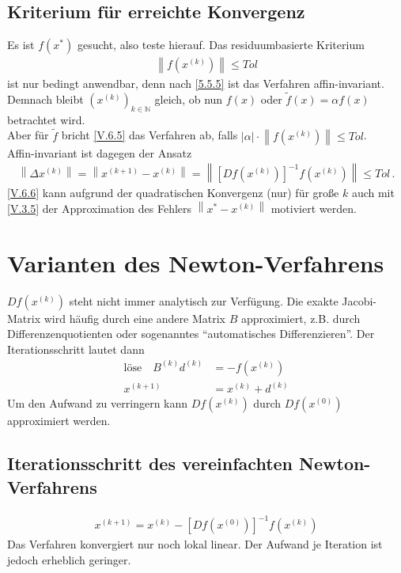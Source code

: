 \documentclass[ngerman,fontsize=11pt, paper=a4, parskip=half, titlepage=true, toc=bib]{scrbook}
\newcommand{\N}{\mathds{N}}
\newcommand{\nn}[1]{\left\| #1 \right\|}
\newcommand{\sectione}[1]{\section{#1} \setcounter{equation}{0}}
\begin{document}
 		
 		\subsection{Kriterium für erreichte Konvergenz}
 		Es ist $f(x^{*})$ gesucht, also teste hierauf. Das residuumbasierte Kriterium
 		\begin{gather}
 			\nn{f(x^{(k)})}\leq Tol
 			\label{V.6.5}
 		\end{gather}
 		ist nur bedingt anwendbar, denn nach \ref{5.5.5} ist das Verfahren affin-invariant.
 		Demnach bleibt $(x^{(k)})_{k\in\N}$ gleich,
 		ob nun $f(x)$ oder $\widetilde{f}(x) =\alpha f(x) $ betrachtet wird.\\
 		Aber für $\widetilde{f}$ bricht \eqref{V.6.5} das Verfahren ab, 
 		falls $|\alpha|\cdot \nn{f(x^{(k)})} \leq Tol$. \\
 		Affin-invariant ist dagegen der Ansatz
 		\begin{gather}
 			\nn{\Delta x^{(k)}}= \nn{x^{(k+1)}-x^{(k)}} 
 					= \nn{[Df(x^{(k)})]^{-1}f(x^{(k)})} 
 					\leq Tol \, .
 					\label{V.6.6}
 		\end{gather}
 		\eqref{V.6.6} kann aufgrund der quadratischen Konvergenz (nur) für 
 		große $k$ auch mit \eqref{V.3.5} der Approximation des Fehlers 
 		$\nn{x^{*}-x^{(k)}} $ motiviert werden.
 		
 		
 		\sectione{Varianten des Newton-Verfahrens}
 		$Df(x^{(k)})$ steht nicht immer analytisch zur Verfügung.
 		Die exakte Jacobi-Matrix wird häufig durch eine andere Matrix $B$ approximiert, 
 		z.B. durch Differenzenquotienten oder sogenanntes
 		\enquote{automatisches Differenzieren}.
 		Der Iterationsschritt lautet dann
 		\begin{align}
 			\text{löse}\quad B^{(k)}d^{(k)} &= -f(x^{(k)}) 
 			\label{V.7.1} \\\nonumber
 			x^{(k+1)} &=x^{(k)} + d^{(k)}
 		\end{align}
 		Um den Aufwand zu verringern kann $Df(x^{(k)})$ durch
 		$Df(x^{(0)})$ approximiert werden.
 		
 		
 		\subsection{Iterationsschritt des vereinfachten Newton-Verfahrens}
 		\begin{gather}
 			x^{(k+1)} = x^{(k)} -[Df(x^{(0)})]^{-1} f(x^{(k)})
 			\label{V.7.2}
 		\end{gather}
 		Das Verfahren konvergiert nur noch lokal linear.
 		Der Aufwand je Iteration ist jedoch erheblich geringer.
 		
\end{document}
